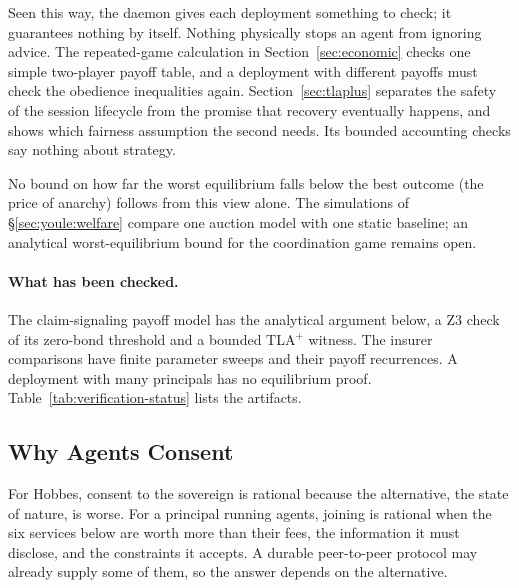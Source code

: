 \documentclass[11pt,a4paper]{article}
\theoremstyle{definition}
\theoremstyle{remark}
\begin{document}
Seen this way, the daemon gives each deployment something to check; it guarantees nothing by itself. Nothing physically stops an agent from ignoring advice. The repeated-game calculation in Section~\ref{sec:economic} checks one simple two-player payoff table, and a deployment with different payoffs must check the obedience inequalities again. Section~\ref{sec:tlaplus} separates the safety of the session lifecycle from the promise that recovery eventually happens, and shows which fairness assumption the second needs. Its bounded accounting checks say nothing about strategy.

No bound on how far the worst equilibrium falls below the best outcome (the price of anarchy) follows from this view alone. The simulations of \S\ref{sec:youle:welfare} compare one auction model with one static baseline; an analytical worst-equilibrium bound for the coordination game remains open.

\paragraph{What has been checked.}
The claim-signaling payoff model has the analytical argument below, a Z3
check of its zero-bond threshold and a bounded TLA$^{+}$ witness. The insurer comparisons have finite parameter
sweeps and their payoff recurrences. A deployment with many principals has
no equilibrium proof. Table~\ref{tab:verification-status} lists the
artifacts.

\subsection{Why Agents Consent}\label{sec:why-consent}

For Hobbes, consent to the sovereign is rational because the alternative, the state of nature, is worse. For a principal running agents, joining is rational when the six services below are worth
more than their fees, the information it must disclose, and the constraints
it accepts. A durable peer-to-peer protocol may already supply some of them,
so the answer depends on the alternative.
\end{document}
